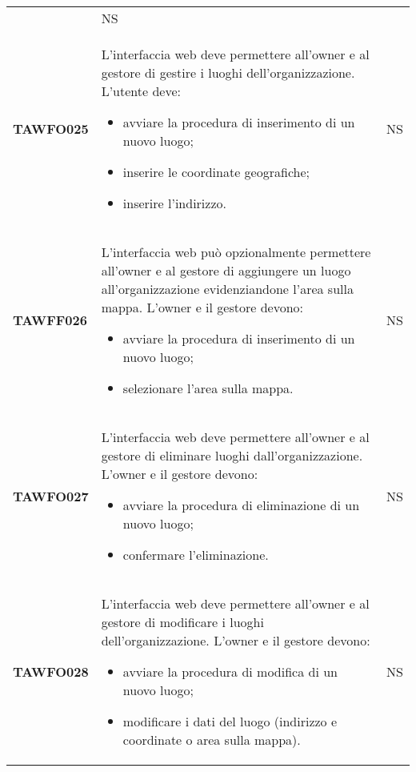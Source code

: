 \documentclass[../piano-di-qualifica.tex]{subfiles}
\begin{document}
\begin{centering}
\begin{longtable}[H]{>{\centering\bfseries}m{3cm} >{}p{10cm} >{\centering\arraybackslash}m{3cm}}
\begin{itemize}
        \end{itemize}
        & NS \\
        TAWFO025      & L'interfaccia web deve permettere all'owner e al gestore di gestire i luoghi dell'organizzazione.         \newline
        L'utente deve:
        \begin{itemize}
         \item avviare la procedura di inserimento di un nuovo luogo;
         \item inserire le coordinate geografiche;
         \item inserire l'indirizzo.
        \end{itemize}
        & NS \\
        TAWFF026      & L'interfaccia web può opzionalmente permettere all'owner e al
        gestore di aggiungere un luogo all'organizzazione evidenziandone
        l'area sulla mappa. \newline
        L'owner e il gestore devono:
        \begin{itemize}
         \item avviare la procedura di inserimento di un nuovo luogo;
         \item selezionare l'area sulla mappa.
        \end{itemize}
        & NS \\
        TAWFO027      & L'interfaccia web deve permettere all'owner e al gestore di eliminare luoghi dall'organizzazione. \newline
        L'owner e il gestore devono:
        \begin{itemize}
         \item avviare la procedura di eliminazione di un nuovo luogo;
         \item confermare l'eliminazione.
        \end{itemize}
        & NS \\
        TAWFO028      & L'interfaccia web deve permettere all'owner e al gestore di modificare i luoghi dell'organizzazione. \newline
        L'owner e il gestore devono:
        \begin{itemize}
         \item avviare la procedura di modifica di un nuovo luogo;
         \item modificare i dati del luogo (indirizzo e coordinate o area sulla mappa).
        \end{itemize}
        & NS \\

\end{longtable}
\end{centering}
\end{document}
